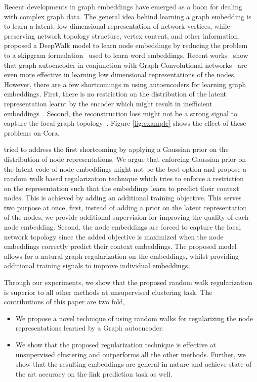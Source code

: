 \documentclass{article}
\begin{document}
Recent developments in graph embeddings have emerged as a boon for dealing with complex graph data. The general idea behind learning a graph embedding is to learn a latent, low-dimensional representation of network vertices, while preserving network topology structure, vertex content, and other information. \cite{perozzi2014deepwalk} proposed a DeepWalk model to learn node embeddings by reducing the problem to a skipgram formulation~\cite{mikolov2013distributed} used to learn word embeddings. Recent works~\cite{vgae} show that graph autoencoder in conjunction with Graph Convolutional networks~\cite{kipf2016semi} are even more effective in learning low dimensional representations of the nodes. However, there are a few shortcomings in using autoencoders for learning graph embeddings. First, there is no restriction on the distribution of the latent representation learnt by the encoder which might result in inefficient embeddings~\cite{argae}. Second, the reconstruction loss might not be a strong signal to capture the local graph topology~\cite{goyal2018capturing}. Figure \ref{fig:example} shows the effect of these problems on Cora.

\cite{argae} tried to address the first shortcoming by applying a Gaussian prior on the distribution of node representations. We argue that enforcing Gaussian prior on the latent code of node embeddings might not be the best option and propose a random walk based regularization technique which tries to enforce a restriction on the representation such that the embeddings learn to predict their context nodes. This is achieved by adding an additional training objective. This serves two purpose at once, first, instead of adding a prior on the latent representation of the nodes, we provide additional supervision for improving the quality of each node embedding. Second, the node embeddings are forced to capture the local network topology since the added objective is maximized when the node embeddings correctly predict their context embeddings. The proposed model allows for a natural graph regularization on the embeddings, whilst providing additional training signals to improve individual embeddings.

Through our experiments, we show that the proposed random walk regularization is superior to all other methods at unsupervised clustering task. The contributions of this paper are two fold,
\begin{itemize}
    \item We propose a novel technique of using random walks for regularizing the node representations learned by a Graph autoencoder.
    \item We show that the proposed regularization technique is effective at unsupervised clustering and outperforms all the other methods. Further, we show that the resulting embeddings are general in nature and achieve state of the art accuracy on the link prediction task as well.
\end{itemize}
\end{document}
